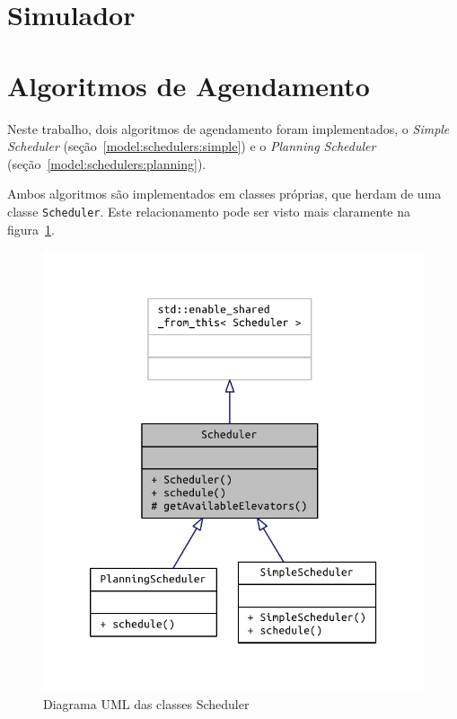 \section{\label{model:simulador}Simulador}


\section{\label{model:schedulers}Algoritmos de Agendamento}
Neste trabalho, dois algoritmos de agendamento foram implementados, o
\textit{Simple Scheduler} (seção~\ref{model:schedulers:simple}) e o
\textit{Planning Scheduler} (seção~\ref{model:schedulers:planning}).

Ambos algoritmos são implementados em classes próprias, que herdam de uma classe
\texttt{Scheduler}. Este relacionamento pode ser visto mais claramente na
figura~\ref{fig:model:schedulers:uml:base}.

\begin{figure}[htb]
  \centering
  \includegraphics{doc/latex/class_scheduler__inherit__graph}
  \caption{Diagrama UML das classes Scheduler}
  \label{fig:model:schedulers:uml:base}
\end{figure}

